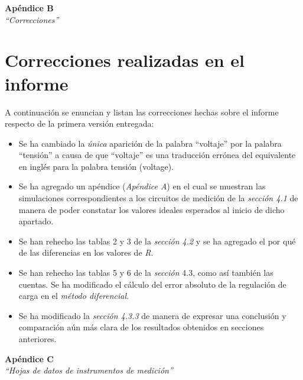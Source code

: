 \documentclass{article}
\begin{document}

\newpage
\vspace*{4cm}
\begin{center}
	\textbf{\Huge{Apéndice B}} \\
	\bigskip\bigskip
	\Large{\textit{``Correcciones''}}
\end{center}

\newpage \textit{}
\newpage


\section*{Correcciones realizadas en el informe}
\medskip

	A continuación se enuncian y listan las correcciones hechas sobre el informe respecto de la primera versión entregada:
\bigskip

\begin{itemize}
	\item Se ha cambiado la \textit{única} aparición de la palabra ``voltaje'' por la palabra ``tensión'' a causa de que ``voltaje'' es una traducción errónea del equivalente en inglés para la palabra tensión (voltage).
	\smallskip
	
	\item Se ha agregado un apéndice (\textit{Apéndice A}) en el cual se muestran las simulaciones correspondientes a los circuitos de medición de la \textit{sección 4.1} de manera de poder constatar los valores ideales esperados al inicio de dicho apartado.
	\smallskip
	
	\item Se han rehecho las tablas 2 y 3 de la \textit{sección 4.2} y se ha agregado el por qué de las diferencias en los valores de \textit{R}.
	\smallskip
	
	\item Se han rehecho las tablas 5 y 6 de la \textit{sección} 4.3, como así también las cuentas. Se ha modificado el cálculo del error absoluto de la regulación de carga en el \textit{método diferencial}.
	\smallskip
	
	\item Se ha modificado la \textit{sección 4.3.3} de manera de expresar una conclusión y comparación aún más clara de los resultados obtenidos en secciones anteriores.

\end{itemize}





\newpage
\vspace*{4cm}
\begin{center}
	\textbf{\Huge{Apéndice C}} \\
	\bigskip\bigskip
	\Large{\textit{``Hojas de datos de instrumentos de medición''}}
\end{center}
\end{document}
